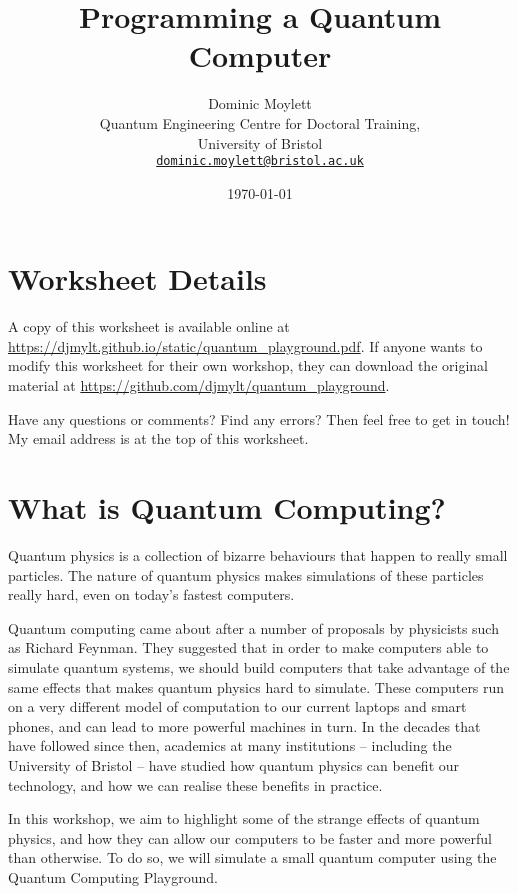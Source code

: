 \documentclass[twocolumn]{article}
\begin{document}
\lstset{style=Style1}

\title{Programming a Quantum Computer}
\author{Dominic Moylett\\
        	Quantum Engineering Centre for Doctoral Training,\\
		University of Bristol\\
		\texttt{\href{mailto:dominic.moylett@bristol.ac.uk}{dominic.moylett@bristol.ac.uk}}
		}
\date{\today}
\maketitle

\section*{Worksheet Details}

A copy of this worksheet is available online at \url{https://djmylt.github.io/static/quantum_playground.pdf}. If anyone wants to modify this worksheet for their own workshop, they can download the original material at \url{https://github.com/djmylt/quantum_playground}.

Have any questions or comments? Find any errors? Then feel free to get in touch! My email address is at the top of this worksheet.

\section{What is Quantum Computing?}

Quantum physics is a collection of bizarre behaviours that happen to really small particles. The nature of quantum physics makes simulations of these particles really hard, even on today's fastest computers.

Quantum computing came about after a number of proposals by physicists such as Richard Feynman. They suggested that in order to make computers able to simulate quantum systems, we should build computers that take advantage of the same effects that makes quantum physics hard to simulate. These computers run on a very different model of computation to our current laptops and smart phones, and can lead to more powerful machines in turn. In the decades that have followed since then, academics at many institutions -- including the University of Bristol -- have studied how quantum physics can benefit our technology, and how we can realise these benefits in practice.

In this workshop, we aim to highlight some of the strange effects of quantum physics, and how they can allow our computers to be faster and more powerful than otherwise. To do so, we will simulate a small quantum computer using the Quantum Computing Playground.
\end{document}
